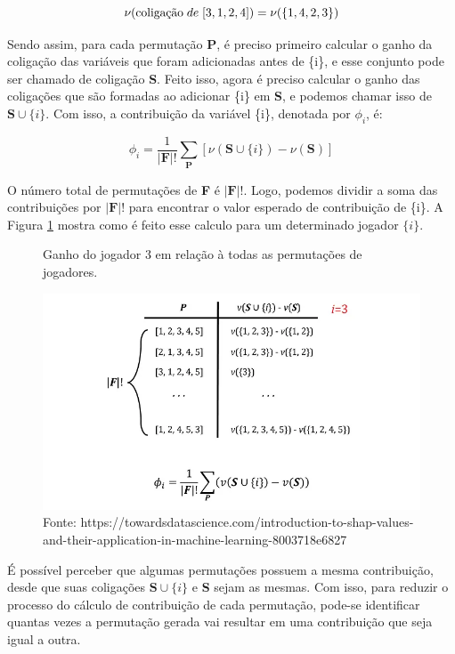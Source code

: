 \[\nu(\text{coligação} \hspace{1mm} de \hspace{1mm} [3,1,2,4]) = \nu(\{1,4,2,3\})\]

Sendo assim, para cada permutação \textbf{P}, é preciso primeiro calcular o ganho da coligação das variáveis que foram adicionadas antes de \{i\}, e esse conjunto pode ser chamado de coligação \textbf{S}. Feito isso, agora é preciso calcular o ganho das coligações que são formadas ao adicionar \{i\} em \textbf{S}, e podemos chamar isso de $\textbf{S} \cup \{i\}$. Com isso, a contribuição da variável \{i\}, denotada por $\phi_{i}$, é:

\begin{equation}
 \phi_i = \frac{1}{|\textbf{F}|!}\sum_{\textbf{P}} [\nu(\textbf{S}\cup\{i\}) - \nu(\textbf{S})]
 \label{eq:value_shap_ini}
\end{equation}

O número total de permutações de \textbf{F} é $|\textbf{F}|!$. Logo, podemos dividir a soma das contribuições por $|\textbf{F}|!$ para encontrar o valor esperado de contribuição de \{i\}. A Figura \ref{fig:total_permuts_shap} mostra como é feito esse calculo para um determinado jogador $\{i\}$.

\begin{figure}[H]
    \centering
    \caption{Ganho do jogador 3 em relação à todas as permutações de jogadores.}
    \includegraphics[scale=0.5]{imagens/shap.png}
    \caption*{Fonte: https://towardsdatascience.com/introduction-to-shap-values-and-their-application-in-machine-learning-8003718e6827}
    \label{fig:total_permuts_shap}
    
\end{figure}

É possível perceber que algumas permutações possuem a mesma contribuição, desde que suas coligações 
$\textbf{S}\cup\{i\}$ e \textbf{S} sejam as mesmas. Com isso, para reduzir o processo do cálculo de contribuição de cada permutação, pode-se identificar quantas vezes a permutação gerada vai resultar em uma contribuição que seja igual a outra.


